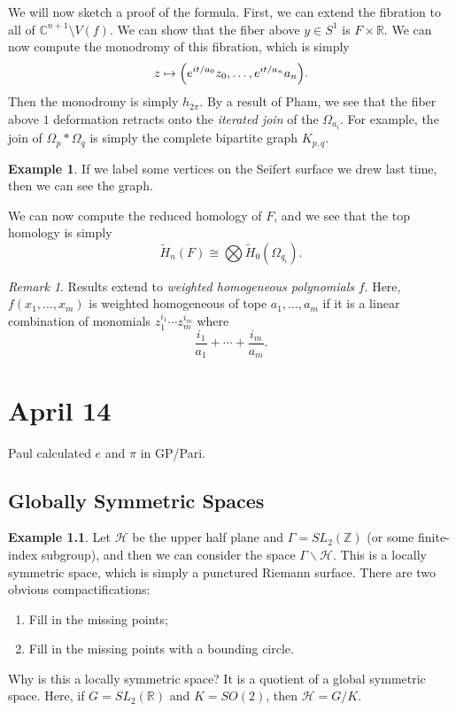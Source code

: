 \documentclass[leqno, openany]{memoir}
\theoremstyle{definition}
\newtheorem{exm}[thm]{Example}
\theoremstyle{remark}
\newtheorem{rmk}[thm]{Remark}
\theoremstyle{plain}
\theoremstyle{definition}
\theoremstyle{remark}
\newcommand{\R}{\mathbb{R}}
\newcommand{\C}{\mathbb{C}}
\newcommand{\Z}{\mathbb{Z}}
\newcommand{\mc}[1]{\mathcal{#1}}
\begin{document}
We will now sketch a proof of the formula. First, we can extend the fibration
to all of $\C^{n+1} \setminus V(f)$. We can show that the fiber above $y \in
S^1$ is $F \times \R$. We can now compute the monodromy of this fibration,
which is simply \[ z \mapsto \qty(e^{it/a_0} z_0, \ldots, e^{it/a_n} a_n). \]
Then the monodromy is simply $h_{2\pi}$. By a result of Pham, we see that the
fiber above $1$ deformation retracts onto the \textit{iterated join} of the
$\Omega_{a_i}$. For example, the join of $\Omega_p * \Omega_q$ is simply the
complete bipartite graph $K_{p,q}$.

\begin{exm} If we label some vertices on the Seifert surface we drew last time,
then we can see the graph.  \end{exm}

We can now compute the reduced homology of $F$, and we see that the top
homology is simply \[ \widetilde{H}_n(F) \cong \bigotimes
\widetilde{H}_0(\Omega_{q_i}). \] 

\begin{rmk} Results extend to \textit{weighted homogeneous polynomials} $f$.
    Here, $f(x_1, \ldots, x_m)$ is weighted homogeneous of tope $a_1, \ldots,
    a_m$ if it is a linear combination of monomials $z_1^{i_1} \cdots
    z_m^{i_m}$ where \[ \frac{i_1}{a_1} + \cdots + \frac{i_m}{a_m}. \]
\end{rmk}

\chapter{April 14}%

Paul calculated $e$ and $\pi$ in GP/Pari.

\section{Globally Symmetric Spaces}%

\begin{exm} Let $\mc{H}$ be the upper half plane and $\Gamma = SL_2(\Z)$ (or
    some finite-index subgroup), and then we can consider the space $\Gamma
    \backslash \mc{H}$. This is a locally symmetric space, which is simply a
    punctured Riemann surface. There are two obvious compactifications:
\begin{enumerate} \item Fill in the missing points; \item Fill in the missing
points with a bounding circle.  \end{enumerate} Why is this a locally symmetric
space? It is a quotient of a global symmetric space. Here, if $G = SL_2(\R)$
and $K = SO(2)$, then $\mc{H} = G/K$.  \end{exm}
\end{document}
